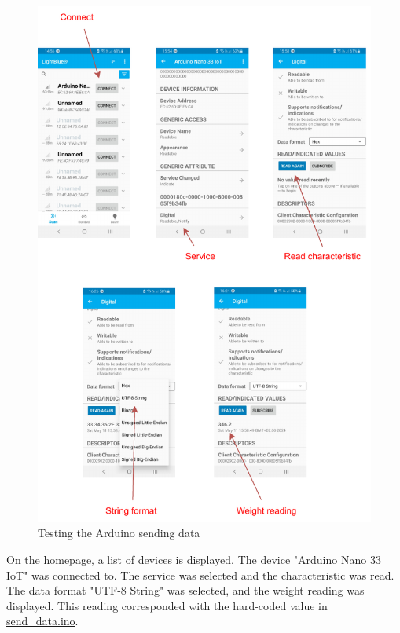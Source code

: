 \documentclass[class=report,11pt,crop=false]{standalone}
\begin{document}
			\begin{figure}[h!]
				\centering
				\includegraphics[width=\linewidth]{"Figures/Screenshots of testing BLE posting.drawio"}
				\caption{Testing the Arduino sending data}
				\label{fig:screenshots-of-testing-ble-posting}
			\end{figure}
		
			On the homepage, a list of devices is displayed. The device "Arduino Nano 33 IoT" was connected to. The service was selected and the characteristic was read. The data format "UTF-8 String" was selected, and the weight reading was displayed. This reading corresponded with the hard-coded value in \href{https://github.com/karanimaan/EEE4113F-Project--Group-26/blob/main/send_data/send_data.ino}{send\_data.ino}.
		
\end{document}
